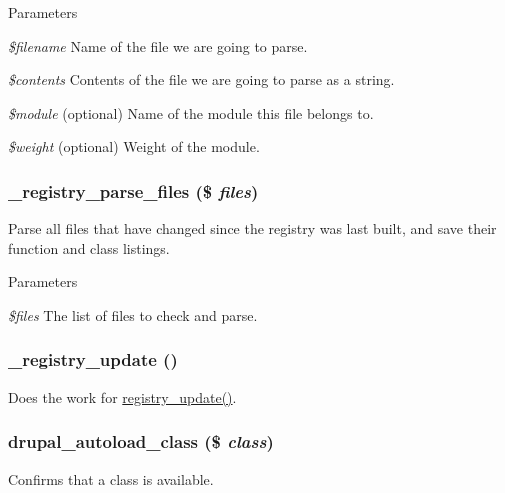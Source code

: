 \begin{DoxyParams}{Parameters}
\item[{\em \$filename}]Name of the file we are going to parse. \item[{\em \$contents}]Contents of the file we are going to parse as a string. \item[{\em \$module}](optional) Name of the module this file belongs to. \item[{\em \$weight}](optional) Weight of the module. \end{DoxyParams}
\hypertarget{group__registry_ga3b95761af0c42b685a2f1c4bc39b12d4}{
\subsubsection[{\_\-registry\_\-parse\_\-files}]{\setlength{\rightskip}{0pt plus 5cm}\_\-registry\_\-parse\_\-files (\$ {\em files})}}
\label{group__registry_ga3b95761af0c42b685a2f1c4bc39b12d4}
Parse all files that have changed since the registry was last built, and save their function and class listings.


\begin{DoxyParams}{Parameters}
\item[{\em \$files}]The list of files to check and parse. \end{DoxyParams}
\hypertarget{group__registry_ga5008c77b133d55af7f1f4442d9e51167}{
\subsubsection[{\_\-registry\_\-update}]{\setlength{\rightskip}{0pt plus 5cm}\_\-registry\_\-update ()}}
\label{group__registry_ga5008c77b133d55af7f1f4442d9e51167}
Does the work for \hyperlink{group__registry_gaab1bcea9fb061684c700676aa5ebe608}{registry\_\-update()}. \hypertarget{group__registry_ga0fee2e4ebba5986067aa486c3436f51e}{
\subsubsection[{drupal\_\-autoload\_\-class}]{\setlength{\rightskip}{0pt plus 5cm}drupal\_\-autoload\_\-class (\$ {\em class})}}
\label{group__registry_ga0fee2e4ebba5986067aa486c3436f51e}
Confirms that a class is available.

